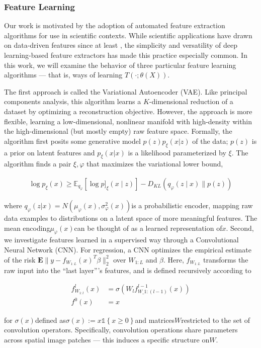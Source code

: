 \subsubsection{Feature Learning}

Our work is motivated by the adoption of automated feature extraction algorithms for use in scientific contexts. While scientific applications have drawn on data-driven features since at least \cite{rao1964}, the simplicity and versatility of deep learning-based feature extractors has made this practice especially common.
In this work, we will examine the behavior of three particular feature learning algorithms — that is, ways of learning $T\left(\cdot; \theta\left(X\right)\right)$.

The first approach is called the Variational Autoencoder (VAE). Like principal components analysis, this algorithm learns a $K$-dimensional reduction of a dataset by optimizing a reconstruction objective. However, the approach is more flexible, learning a low-dimensional, nonlinear manifold with high-density within the high-dimensional (but mostly empty) raw feature space. Formally, the algorithm first posits some generative model $p\left(z\right)p_{\xi}\left(x \vert z\right)$ of the data; $p\left(z\right)$ is a prior on latent features and $p_{\xi}\left(x \vert x\right)$ is a likelihood parameterized by $\xi$. The algorithm finds a pair $\xi, \varphi$ that maximizes the variational lower bound,

\begin{align*}
\log p_{\xi}\left(x\right) \geq  \mathbb{E}_{q_{\varphi}}\left[\log p]_{\xi}(x \mid z)\right]-D_{KL}\left(q_{\varphi}(z \mid x) \| p(z)\right)
\end{align*}

where $q_{\varphi}\left(z \vert x\right) = N\left(\mu_{\varphi}\left(x\right), \sigma^{2}_{\varphi}\left(x\right)\right)$is a probabilistic encoder, mapping raw data examples to distributions on a latent space of more meaningful features. The mean encoding$\mu_{\varphi}\left(x\right)$can be thought of as a learned representation of$x$.
Second, we investigate features learned in a supervised way through a
Convolutional Neural Network (CNN). For regression, a CNN optimizes the
empirical estimate of the risk $\mathbf{E}\|y -
f_{W_{1:L}}\left(x\right)^{T}\beta\|_{2}^{2}$ over $W_{1:L}$ and $\beta$. Here,
$f_{W_{1:L}}$ transforms the raw input into the ``last layer''’s features, and
is defined recursively according to

\begin{align*}
f^{l}_{W_{1:l}}\left(x\right) &= \sigma\left(W_{l}f^{l - 1}_{W\_{1:(l - 1)}}\left(x\right)\right)\\
f^{0}\left(x\right) &= x
\end{align*}

for $\sigma\left(x\right)$defined as$\sigma\left(x\right) := x \mathbb{1}\left\{x \geq 0\right\}$and matrices$W$restricted to the set of convolution operators. Specifically, convolution operations share parameters across spatial image patches — this induces a specific structure on$W$.

